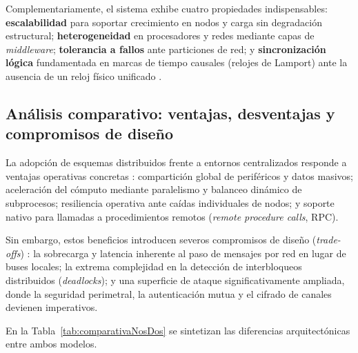 \documentclass[12pt]{article}
\begin{document}
Complementariamente, el sistema exhibe cuatro propiedades indispensables: \textbf{escalabilidad} para soportar crecimiento en nodos y carga sin degradación estructural; \textbf{heterogeneidad} en procesadores y redes mediante capas de \textit{middleware}; \textbf{tolerancia a fallos} ante particiones de red; y \textbf{sincronización lógica} fundamentada en marcas de tiempo causales (relojes de Lamport) ante la ausencia de un reloj físico unificado \parencite[\S 18.1, p.\ 605]{silberschatz2006fundamentos}.

\subsection{Análisis comparativo: ventajas, desventajas y compromisos de diseño}
\label{sec:analisisComparativoNosDos}

La adopción de esquemas distribuidos frente a entornos centralizados responde a ventajas operativas concretas \parencite[\S 16.1, pp.\ 557--559]{silberschatz2006fundamentos}: compartición global de periféricos y datos masivos; aceleración del cómputo mediante paralelismo y balanceo dinámico de subprocesos; resiliencia operativa ante caídas individuales de nodos; y soporte nativo para llamadas a procedimientos remotos (\textit{remote procedure calls}, RPC).

Sin embargo, estos beneficios introducen severos compromisos de diseño (\textit{trade-offs}) \parencite[\S 17.2, p.\ 788]{deitel2004operating}: la sobrecarga y latencia inherente al paso de mensajes por red en lugar de buses locales; la extrema complejidad en la detección de interbloqueos distribuidos (\textit{deadlocks}); y una superficie de ataque significativamente ampliada, donde la seguridad perimetral, la autenticación mutua y el cifrado de canales devienen imperativos.

En la Tabla~\ref{tab:comparativaNosDos} se sintetizan las diferencias arquitectónicas entre ambos modelos.
\end{document}
